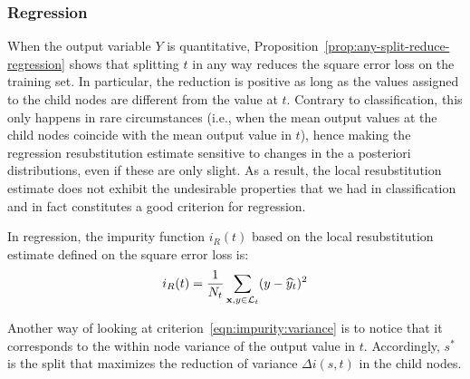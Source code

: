 \subsubsection{Regression}
\label{sec:3:criteria:regression}

When the output variable $Y$ is quantitative, Proposition~\ref{prop:any-split-reduce-regression}
shows that splitting $t$ in any way reduces the
square error loss on the training set. In particular, the reduction is positive as long as
the values assigned to the child nodes are different from the value at $t$.
Contrary to classification, this only happens in rare circumstances (i.e., when
the mean output values at the child nodes coincide with the mean output value
in $t$), hence making the regression resubstitution estimate sensitive to changes in the a
posteriori distributions, even if these are only slight.  As a result, the
local resubstitution estimate does not exhibit the undesirable properties that
we had in classification and in fact constitutes a good criterion for
regression.

\begin{definition}
In regression, the impurity function $i_R(t)$ based on the local resubstitution estimate
defined on the square error loss is:
\begin{equation}\label{eqn:impurity:variance}
i_R(t) = \frac{1}{N_t} \sum_{\mathbf{x}, y \in {\cal L}_t} (y - \widehat{y}_t)^2
\end{equation}
\end{definition}

Another way of looking at criterion~\ref{eqn:impurity:variance} is to notice
that it corresponds to the within node variance of the output value in $t$.
Accordingly, $s^*$ is the split that maximizes the reduction of variance
$\Delta i(s, t)$ in the child nodes.

